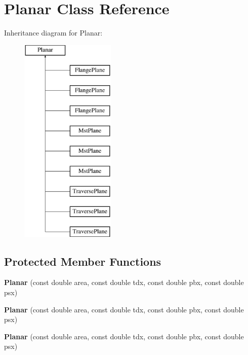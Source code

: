\hypertarget{class_planar}{}\section{Planar Class Reference}
\label{class_planar}
Inheritance diagram for Planar\+:\begin{figure}[H]
\begin{center}
\leavevmode
\includegraphics[height=10.000000cm]{d2/ddc/class_planar}
\end{center}
\end{figure}
\subsection*{Protected Member Functions}
\begin{DoxyCompactItemize}
\item 
\mbox{\label{class_planar_ac15d774625cfccef75b1fa5742482f5a}} 
{\bfseries Planar} (const double area, const double tdx, const double pbx, const double psx)
\item 
\mbox{\label{class_planar_ac15d774625cfccef75b1fa5742482f5a}} 
{\bfseries Planar} (const double area, const double tdx, const double pbx, const double psx)
\item 
\mbox{\label{class_planar_ac15d774625cfccef75b1fa5742482f5a}} 
{\bfseries Planar} (const double area, const double tdx, const double pbx, const double psx)
\end{DoxyCompactItemize}
